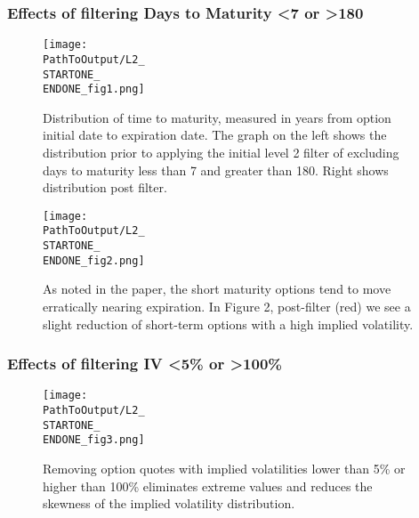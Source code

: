 \begin{appendix}
\subsubsection{Effects of filtering Days to Maturity <7 or >180}
\begin{figure}[H] %
  \centering
  \texttt{[image: \\PathToOutput/L2\_\\STARTONE\_\\ENDONE\_fig1.png]}%
  \caption{Distribution of time to maturity, measured in years from option initial date to expiration date. The graph on the left shows the distribution prior to applying the initial level 2 filter of excluding days to maturity less than 7 and greater than 180. Right shows distribution post filter.}
\label{fig:time1lvl2fig1}
\end{figure}

\begin{figure}[H] %
  \centering
  \texttt{[image: \\PathToOutput/L2\_\\STARTONE\_\\ENDONE\_fig2.png]}%
\captionsetup{font=normalfont}
  \caption{As noted in the paper, the short maturity options tend to move erratically nearing expiration. In Figure 2, post-filter (red) we see a slight reduction of short-term options with a high implied volatility.}
\label{fig:time1lvl2fig2}
\end{figure}

\subsubsection{Effects of filtering IV <5\% or >100\%}
\begin{figure}[H] %
  \centering
{}
  \texttt{[image: \\PathToOutput/L2\_\\STARTONE\_\\ENDONE\_fig3.png]}%
\captionsetup{font=normalfont}
  \caption{Removing option quotes with implied volatilities lower than 5\% or higher than 100\% eliminates extreme values and reduces the skewness of the implied volatility distribution.}
\label{fig:time1lvl2fig3}
\end{figure}



\end{appendix}
